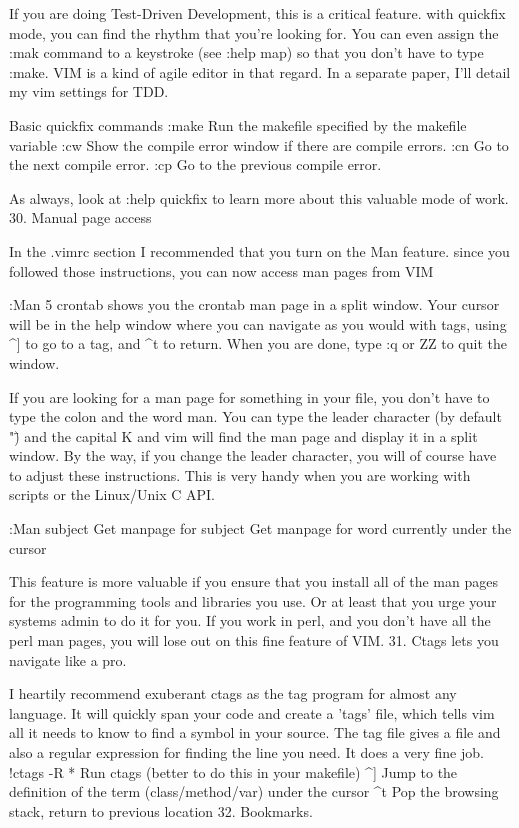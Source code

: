 \documentclass[a4paper, 12pt]{article}
\begin{document}
      If you are doing Test-Driven Development, this is a critical feature. with quickfix mode, you can find the rhythm that you're looking for. You can even assign the :mak command to a keystroke (see :help map) so that you don't have to type :make. VIM is a kind of agile editor in that regard. In a separate paper, I'll detail my vim settings for TDD.

      Basic quickfix commands
      :make	Run the makefile specified by the makefile variable
      :cw	Show the compile error window if there are compile errors.
      :cn	Go to the next compile error.
      :cp	Go to the previous compile error.

      As always, look at :help quickfix to learn more about this valuable mode of work.
  30. Manual page access

      In the .vimrc section I recommended that you turn on the Man feature. since you followed those instructions, you can now access man pages from VIM

      :Man 5 crontab shows you the crontab man page in a split window. Your cursor will be in the help window where you can navigate as you would with tags, using ^] to go to a tag, and ^t to return. When you are done, type :q or ZZ to quit the window.

      If you are looking for a man page for something in your file, you don't have to type the colon and the word man. You can type the leader character (by default "\") and the capital K and vim will find the man page and display it in a split window. By the way, if you change the leader character, you will of course have to adjust these instructions. This is very handy when you are working with scripts or the Linux/Unix C API.

      :Man subject	Get manpage for subject
      \K	Get manpage for word currently under the cursor

      This feature is more valuable if you ensure that you install all of the man pages for the programming tools and libraries you use. Or at least that you urge your systems admin to do it for you. If you work in perl, and you don't have all the perl man pages, you will lose out on this fine feature of VIM.
  31. Ctags lets you navigate like a pro.

      I heartily recommend exuberant ctags as the tag program for almost any language. It will quickly span your code and create a 'tags' file, which tells vim all it needs to know to find a symbol in your source. The tag file gives a file and also a regular expression for finding the line you need. It does a very fine job.
      !ctags -R *	Run ctags (better to do this in your makefile)
      ^]	Jump to the definition of the term (class/method/var) under the cursor
      ^t	Pop the browsing stack, return to previous location
  32. Bookmarks.
\end{document}
